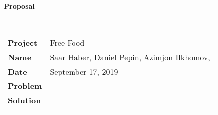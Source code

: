 \documentclass[11pt]{article}
\newcommand{\info}{
  \begin{tabular}{l p{6.5in}}
    \textbf{Project}    & Free Food \\ \hdashline
    \textbf{Name}       & Saar Haber, Daniel Pepin, Azimjon Ilkhomov, \\ \hdashline
    \textbf{Date}       & September 17, 2019 \\ \hdashline
    \textbf{Problem}    & \\ \hdashline
    \textbf{Solution}   &  \\ \hdashline
  \end{tabular}
}
\begin{document}
\begin{flushright}\textbf{\large Proposal}\end{flushright}
\ttfamily
~ \\
\info
\end{document}
